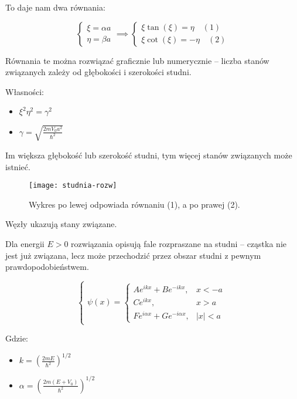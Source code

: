 To daje nam dwa równania:


\[
\begin{cases}
    \xi = \alpha a \\
    \eta = \beta a
\end{cases}
\implies
\begin{cases}
    \xi \tan(\xi) = \eta \quad (1) \\
    \xi \cot(\xi) = -\eta \quad (2)
\end{cases}
\]

Równania te można rozwiązać graficznie lub numerycznie – liczba stanów
związanych zależy od głębokości i szerokości studni.


Własności:
\begin{itemize}
    \item $\xi^2 \eta^2 = \gamma^2$
    \item $\gamma = \sqrt{\frac{2mV_0 a^2}{\hbar^2}}$
\end{itemize}

Im większa głębokość lub szerokość studni, tym więcej stanów związanych może istnieć.

\begin{figure}[H]
    \centering
    \texttt{[image: studnia-rozw]}
    \caption{Wykres po lewej odpowiada równaniu (1), a po prawej (2).}
    \label{fig:studnia-rozw}
\end{figure}

Węzły ukazują stany związane.


Dla energii $E > 0$ rozwiązania opisują fale rozpraszane na studni – cząstka nie
jest już związana, lecz może przechodzić przez obszar studni z pewnym prawdopodobieństwem.


\begin{equation*}
    \begin{cases}
        \psi(x) =
        \begin{cases}
            A e^{ikx} + B e^{-ikx}, & x < -a \\
            C e^{ikx}, & x > a \\
            F e^{i\alpha x} + G e^{-i\alpha x}, & |x| < a
        \end{cases}
    \end{cases}
\end{equation*}

Gdzie:
\begin{itemize}
    \item $k = \left( \frac{2mE}{\hbar^2} \right)^{1/2}$
    \item $\alpha = \left( \frac{2m(E + V_0)}{\hbar^2} \right)^{1/2}$
\end{itemize}


